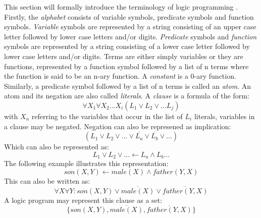 \documentclass{article}
\begin{document}
This section will formally introduce the terminology of logic programming
\cite{folp}. Firstly, the {\it alphabet} consists of variable symbols,
predicate symbols and function symbols. {\it Variable} symbols are represented by a
string consisting of an upper case letter followed by lower case letters and/or
digits. {\it Predicate} symbols and {\it function} symbols are represented by a string 
consisting of a lower case letter followed by lower case letters and/or digits.
Terms are either simply variables or they are functions, represented by a
function symbol followed by a list of n terms where the function is said to be
an n-ary function. A {\it constant} is a 0-ary function. Similarly, a predicate
symbol followed by a list of n terms is called an {\it atom}. An atom and its
negation are also called {\it literals}. A {\it clause} is a formula of the
form:
\begin{equation}
\displaystyle
\forall X_1 \forall X_2 ... X_i(L_1 \vee L_2 \vee ...L_j)
\end{equation}
with $X_n$ referring to the variables that occur in the list of $L_i$ literals,
variables in a clause may be negated. Negation can also be represened as
implication:
\begin{equation}
\displaystyle
(L_1 \vee L_2 \vee ... \vee \overline{L_a} \vee \overline{L_b} \vee ...)
\end{equation}
Which can also be represented as:
\begin{equation}
\displaystyle
L_1 \vee L_2 \vee ... \leftarrow L_a \wedge L_b ... 
\end{equation} 
The following example illustrates this representation:
\begin{equation}
\displaystyle
son(X,Y) \leftarrow male(X) \wedge father(Y,X)
\end{equation}
This can also be written as:
\begin{equation}
\displaystyle
\forall X \forall Y : son(X,Y) \vee \overline{male(X)} \vee
\overline{father(Y,X)}
\end{equation}
A logic program may represent this clause as a set:
\begin{equation}
\displaystyle
\{son(X,Y),\overline{male(X)},\overline{father(Y,X)}\}
\end{equation}



\end{document}

